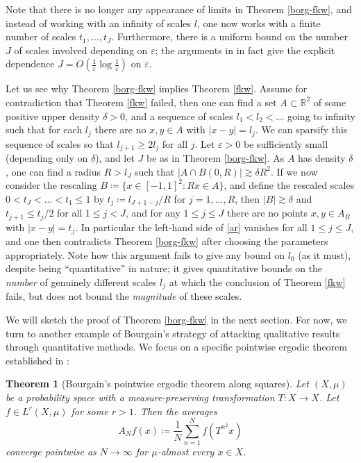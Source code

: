 \documentclass[12pt,a4paper,reqno]{amsart}
\numberwithin{equation}{section}
\theoremstyle{plain}
\newtheorem{theorem}{Theorem}[section]
\theoremstyle{definition}
\newcommand\R{\mathbb{R}}
\newcommand\eps{\varepsilon}
\begin{document}
Note that there is no longer any appearance of limits in Theorem \ref{borg-fkw}, and instead of working with an infinity of scales $l$, one now works with a finite number of scales $t_1,\dots,t_J$.  Furthermore, there is a uniform bound on the number $J$ of scales involved depending on $\eps$; the arguments in \cite{density} in fact give the explicit dependence $J = O( \frac{1}{\eps} \log \frac{1}{\eps})$ on $\eps$.

Let us see why Theorem \ref{borg-fkw} implies Theorem \ref{fkw}.  Assume for contradiction that Theorem \ref{fkw} failed, then one can find a set $A \subset \R^2$ of some positive upper density $\delta>0$, and a sequence of scales $l_1 < l_2 < \dots$ going to infinity such that for each $l_j$ there are no $x,y \in A$ with $|x-y|=l_j$.  We can sparsify this sequence of scales so that $l_{j+1} \geq 2l_j$ for all $j$.  Let $\eps>0$ be sufficiently small (depending only on $\delta$), and let $J$ be as in Theorem \ref{borg-fkw}.  As $A$ has density $\delta$, one can find a radius $R > l_J$ such that $|A \cap B(0,R)| \gtrsim \delta R^2$.  If we now consider the rescaling $B \coloneqq \{ x \in [-1,1]^2: Rx \in A \}$, and define the rescaled scales $0 < t_J < \dots < t_1 \leq 1$ by $t_j \coloneqq  l_{J+1-j}/R$ for $j=1,\dots,R$, then $|B| \gtrsim \delta$ and $t_{j+1} \leq t_j/2$ for all $1 \leq j < J$, and for any $1 \leq j \leq J$ there are no points $x,y \in A_R$ with $|x-y|=t_j$.  In particular the left-hand side of \eqref{ar} vanishes for all $1 \leq j \leq J$, and one then contradicts Theorem \ref{borg-fkw} after choosing the parameters appropriately.  Note how this argument fails to give any bound on $l_0$ (as it must), despite being ``quantitative'' in nature; it gives quantitative bounds on the \emph{number} of genuinely different scales $l_j$ at which the conclusion of Theorem \ref{fkw} fails, but does not bound the \emph{magnitude} of these scales.  

We will sketch the proof of Theorem \ref{borg-fkw} in the next section.  For now, we turn to another example of Bourgain's strategy of attacking qualitative results through quantitative methods.  We focus on a specific pointwise ergodic theorem established in \cite[Theorem 1]{ergodic}:

\begin{theorem}[Bourgain's pointwise ergodic theorem along squares]\label{pet}  Let $(X, \mu)$ be a probability space with a measure-preserving transformation $T: X \to X$.  Let $f \in L^r(X,\mu)$ for some $r>1$.  Then the averages
$$ A_N f(x) \coloneqq   \frac{1}{N} \sum_{n=1}^N f( T^{n^2} x )$$
converge pointwise as $N \to \infty$ for $\mu$-almost every $x \in X$.
\end{theorem}
\end{document}
